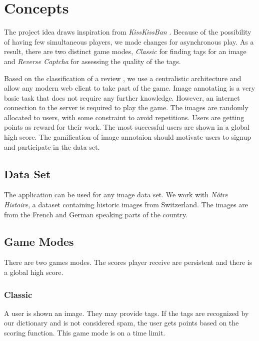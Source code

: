 \section{Concepts}
\label{g14:sec:concepts} 

The project idea draws inspiration from \textit{KissKissBan} \cite{10.1145/1600150.1600153}.
Because of the possibility of having few simultaneous players, we made changes for asynchronous play. As a result, there are two distinct game modes, \emph{Classic} for finding tags for an image and \emph{Reverse Captcha} for assessing the quality of the tags.

Based on the classification of a review \cite{8566148}, we use a centralistic architecture and allow any modern web client to take part of the game. Image annotating is a very basic task that does not require any further knowledge. However, an internet connection to the server is required to play the game. The images are randomly allocated to users, with some constraint to avoid repetitions.
Users are getting points as reward for their work. The most successful users are shown in a global high score. The gamification of image annotaion should motivate users to signup and participate in the data set.


\subsection{Data Set}
\label{g14:sec:concepts:dataset}
The application can be used for any image data set. We work with \textit{Nôtre Histoire}, a dataset containing historic images from Switzerland. The images are from the French and German speaking parts of the country.

\subsection{Game Modes}
\label{g14:sec:concepts:gamemodes}

There are two games modes. The scores player receive are persistent and there is a global high score. 

\subsubsection{Classic}
\label{g14:sec:concepts:gamemodes:classic}
A user is shown an image. They may provide tags. If the tags are recognized by our dictionary and is not considered spam, the user gets points based on the scoring function.
This game mode is on a time limit.

